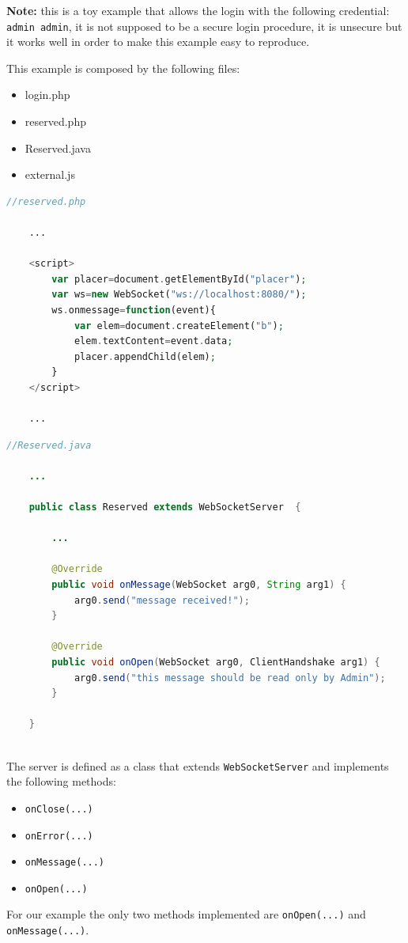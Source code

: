 	\textbf{Note:} this is a toy example that allows the login with the following credential: \texttt{admin admin}, it is not supposed to be a secure login procedure, it is unsecure but it works well in order to make this example easy to reproduce.
	
		This example is composed by the following files:
	\begin{itemize}
		\item login.php
		\item reserved.php
		\item Reserved.java
		\item external.js
	\end{itemize}
		
	\begin{lstlisting}[language=php]
	//reserved.php
	
	...
	
	<script>
		var placer=document.getElementById("placer");
		var ws=new WebSocket("ws://localhost:8080/");
		ws.onmessage=function(event){
			var elem=document.createElement("b");
			elem.textContent=event.data;
			placer.appendChild(elem);
		}
	</script>
	
	...

	\end{lstlisting}
	
	\begin{lstlisting}[language=Java]
	//Reserved.java

	...

	public class Reserved extends WebSocketServer  {
		
		...
		
		@Override
		public void onMessage(WebSocket arg0, String arg1) {
			arg0.send("message received!");
		}
		
		@Override
		public void onOpen(WebSocket arg0, ClientHandshake arg1) {
			arg0.send("this message should be read only by Admin");
		}

	}
	
	\end{lstlisting}
	
	The server is defined as a class that extends \texttt{WebSocketServer} and implements the following methods:
	\begin{itemize}
		\item \texttt{onClose(...)}
		\item \texttt{onError(...)}
		\item \texttt{onMessage(...)}
		\item \texttt{onOpen(...)}
	\end{itemize}
	For our example the only two methods implemented are \texttt{onOpen(...)} and \texttt{onMessage(...)}.
	
